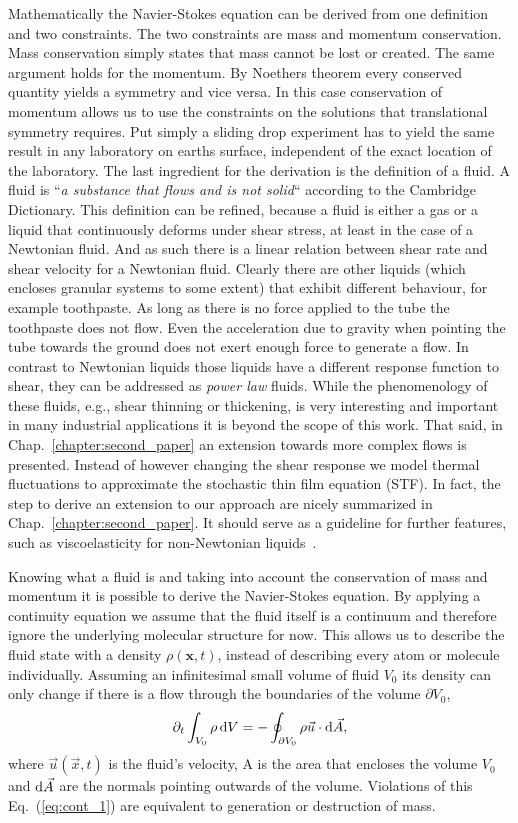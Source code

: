 Mathematically the Navier-Stokes equation can be derived from one definition and two constraints.
The two constraints are mass and momentum conservation.
Mass conservation simply states that mass cannot be lost or created.
The same argument holds for the momentum.
By Noethers theorem every conserved quantity yields a symmetry and vice versa.
In this case conservation of momentum allows us to use the constraints on the solutions that translational symmetry requires.
Put simply a sliding drop experiment has to yield the same result in any laboratory on earths surface, independent of the exact location of the laboratory.
The last ingredient for the derivation is the definition of a fluid.
A fluid is ``\textit{a substance that flows and is not solid}`` according to the Cambridge Dictionary.
This definition can be refined, because a fluid is either a gas or a liquid that continuously deforms under shear stress, at least in the case of a Newtonian fluid.
And as such there is a linear relation between shear rate and shear velocity for a Newtonian fluid.
Clearly there are other liquids (which encloses granular systems to some extent) that exhibit different behaviour, for example toothpaste.
As long as there is no force applied to the tube the toothpaste does not flow.
Even the acceleration due to gravity when pointing the tube towards the ground does not exert enough force to generate a flow.
In contrast to Newtonian liquids those liquids have a different response function to shear, they can be addressed as \textit{power law} fluids.
While the phenomenology of these fluids, e.g., shear thinning or thickening, is very interesting and important in many industrial applications it is beyond the scope of this work. 
That said, in Chap.~\ref{chapter:second_paper} an extension towards more complex flows is presented. 
Instead of however changing the shear response we model thermal fluctuations to approximate the stochastic thin film equation (STF).
In fact, the step to derive an extension to our approach are nicely summarized in Chap.~\ref{chapter:second_paper}. 
It should serve as a guideline for further features, such as viscoelasticity for non-Newtonian liquids~\cite{bouchutNewModelShallow2013}. 

Knowing what a fluid is and taking into account the conservation of mass and momentum it is possible to derive the Navier-Stokes equation. 
By applying a continuity equation we assume that the fluid itself is a continuum and therefore ignore the underlying molecular structure for now. 
This allows us to describe the fluid state with a density $\rho(\mathbf{x},t)$, instead of describing every atom or molecule individually.
Assuming an infinitesimal small volume of fluid $V_0$ its density can only change if there is a flow through the boundaries of the volume $\partial V_0$,
\begin{equation}\label{eq:cont_1}
    \partial_t\int_{V_0}\rho\mathop{}\!\mathrm{d} V = -\oint_{\partial V_0} \rho\vec{u}\cdot\mathop{}\!\mathrm{d} \vec{A}, 
\end{equation}
where $\vec{u}(\vec{x},t)$ is the fluid's velocity, A is the area that encloses the volume $V_0$ and $\mathop{}\!\mathrm{d}\vec{A}$ are the normals pointing outwards of the volume.
Violations of this Eq.~(\ref{eq:cont_1}) are equivalent to generation or destruction of mass.

